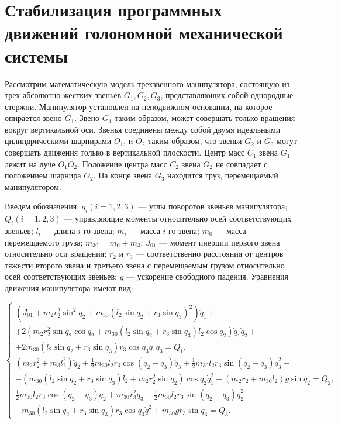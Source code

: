 
\section{Стабилизация программных движений голономной механической системы } \label{p31}

 Рассмотрим математическую модель трехзвенного манипулятора, состоящую из трех абсолютно жестких звеньев $G_1, G_2, G_3$, представляющих собой однородные стержни. Манипулятор установлен на неподвижном основании, на которое опирается звено $G_1$. Звено $G_1$ таким образом, может совершать только вращения вокруг вертикальной оси. Звенья соединены между собой двумя идеальными цилиндрическими шарнирами $O_1$, и $O_2$ таким образом, что звенья $G_2$ и $G_3$ могут совершать движения только в вертикальной плоскости. Центр масс $C_1$ звена $G_1$ лежит на луче  $O_1 O_2$. Положение центра масс $C_2$ звена $G_2$ не совпадает с положением шарнира $O_2$. На конце звена $G_3$ находится груз, перемещаемый манипулятором.
 
 Введем обозначения: $q_i (i = 1, 2, 3)$ --- углы поворотов звеньев манипулятора; $Q_i (i = 1, 2, 3)$ ---  управляющие моменты относительно осей соответствующих звеньев; $l_i$  ---  длина   $i$-го звена;   $m_i$ --- масса  $i$-го звена;    $m_0$ ---  масса перемещаемого груза;  $m_30 = m_0 + m_3$; $J_{01}$  ---  момент инерции первого звена относительно оси вращения; $r_2$ и $r_3$ --- соответственно расстояния от центров тяжести второго звена и третьего звена с перемещаемым грузом относительно осей соответствующих звеньев; $g$ --- ускорение свободного падения.
 Уравнения движения манипулятора имеют вид:
 
 \begin{equation*}
 \begin{cases}
 (J_{01} + m_2 r_2^2 \sin^2 q_2 + m_{30} (l_2 \sin q_2 + r_3 \sin q_3)^2) \ddot q_1 + \\ + 2 (m_2 r_2^2 \sin q_2 \cos q_2 + m_{30} (l_2 \sin q_2 + r_3 \sin q_3) l_2 \cos q_2) \dot q_1 \dot q_2 + \\ + 2 m_{30} (l_2 \sin q_2 + r_3 \sin q_3) r_3 \cos q_3 \dot q_1 \dot q_3 = Q_1,
 \\
 (m_2 r_2^2 + m_3 l_2^2) \ddot q_2 + \frac12 m_{30} l_2 r_3 \cos(q_2 - q_3) \ddot q_3 + \frac12 m_{30} l_2 r_3 \sin (q_2 - q_3) \dot q_3^2 - \\ - (m_{30} (l_2 \sin q_2 + r_3 \sin q_3) l_2 + m_2 r_2^2 \sin q_2) \cos q_2 \dot q_1^2 + (m_2 r_2 + m_{30} l_2) g \sin q_2 = Q_2,
 \\
 \frac12 m_{30} l_2 r_3 \cos(q_2 - q_3) \ddot q_2 + m_{30} r_3^2 \ddot q_3 - \frac12 m_{30} l_2 r_3 \sin (q_2 - q_3) \dot q_2^2 - \\ - m_{30} (l_2 \sin q_2 + r_3 \sin q_3) r_3 \cos q_3 \dot q_1^2 + m_{30} g r_3 \sin q_3 = Q_3.
 \end{cases}
 \end{equation*}
 
